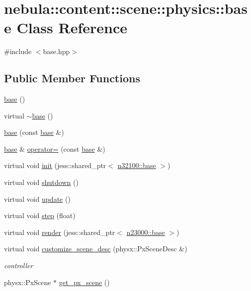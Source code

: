 \hypertarget{classnebula_1_1content_1_1scene_1_1physics_1_1base}{
\section{nebula::content::scene::physics::base Class Reference}
\label{classnebula_1_1content_1_1scene_1_1physics_1_1base}
}


{\ttfamily \#include $<$base.hpp$>$}\subsection*{Public Member Functions}
\begin{DoxyCompactItemize}
\item 
\hyperlink{classnebula_1_1content_1_1scene_1_1physics_1_1base_a021797216ccfeeb832000af0f292f808}{base} ()
\item 
virtual \hyperlink{classnebula_1_1content_1_1scene_1_1physics_1_1base_a793813e3721069c38cb7920eb4c23611}{$\sim$base} ()
\item 
\hyperlink{classnebula_1_1content_1_1scene_1_1physics_1_1base_a45a906d04de5d389baa2b681e557b6ce}{base} (const \hyperlink{classnebula_1_1content_1_1scene_1_1physics_1_1base}{base} \&)
\item 
\hyperlink{classnebula_1_1content_1_1scene_1_1physics_1_1base}{base} \& \hyperlink{classnebula_1_1content_1_1scene_1_1physics_1_1base_ae87709e0143d951222b9c25e729465db}{operator=} (const \hyperlink{classnebula_1_1content_1_1scene_1_1physics_1_1base}{base} \&)
\item 
virtual void \hyperlink{classnebula_1_1content_1_1scene_1_1physics_1_1base_a7ed41d6ac0f30383f9850d0fe63f42b0}{init} (jess::shared\_\-ptr$<$ \hyperlink{classnebula_1_1content_1_1scene_1_1admin_1_1base}{n32100::base} $>$)
\item 
virtual void \hyperlink{classnebula_1_1content_1_1scene_1_1physics_1_1base_a8756fe60c03a137871a7ae5b112eba8b}{shutdown} ()
\item 
virtual void \hyperlink{classnebula_1_1content_1_1scene_1_1physics_1_1base_afaa3bda37a840dade44339ba8e5022e1}{update} ()
\item 
virtual void \hyperlink{classnebula_1_1content_1_1scene_1_1physics_1_1base_a4d901bf4eaf58c8cfa24559194ca8270}{step} (float)
\item 
virtual void \hyperlink{classnebula_1_1content_1_1scene_1_1physics_1_1base_a2630effa0e3bacf02008aa4620cb2e25}{render} (jess::shared\_\-ptr$<$ \hyperlink{classnebula_1_1platform_1_1renderer_1_1base}{n23000::base} $>$)
\item 
virtual void \hyperlink{classnebula_1_1content_1_1scene_1_1physics_1_1base_a2bd70fe2ca923b841d703cf26e52f931}{customize\_\-scene\_\-desc} (physx::PxSceneDesc \&)
\begin{DoxyCompactList}\small\item\em controller \item\end{DoxyCompactList}\item 
physx::PxScene $\ast$ \hyperlink{classnebula_1_1content_1_1scene_1_1physics_1_1base_a134531a81a5c1debd180bde31a3d722a}{get\_\-px\_\-scene} ()
\end{DoxyCompactItemize}
